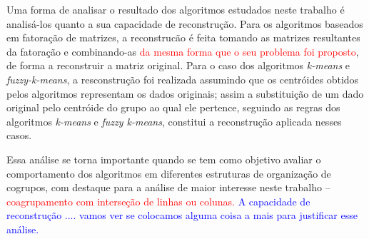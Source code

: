 \documentclass[
    12pt,                %
    oneside,            %
    a4paper,            %
    english,            %
    brazil                %
    ]{abntex2ppgsi}
\begin{document}

Uma forma de analisar o resultado dos algoritmos estudados neste trabalho é analisá-los quanto a sua capacidade de reconstrução. Para os algoritmos baseados em fatoração de matrizes, a reconstrucão é feita tomando as matrizes resultantes da fatoração e combinando-as \textcolor{red}{da mesma forma que o seu problema foi proposto}, de forma a reconstruir a matriz original. Para o caso dos algoritmos \textit{k-means} e \textit{fuzzy-k-means}, a resconstrução foi realizada assumindo que os centróides obtidos pelos algoritmos representam os dados originais; assim a substituição de um dado original pelo centróide do grupo ao qual ele pertence, seguindo as regras dos algoritmos \textit{k-means} e \textit{fuzzy k-means}, constitui a reconstrução aplicada nesses casos.

Essa análise se torna importante quando se tem como objetivo avaliar o comportamento dos algoritmos em diferentes estruturas de organização de cogrupos, com destaque para a análise de maior interesse neste trabalho -- \textcolor{red}{coagrupamento com interseção de linhas ou colunas.} \textcolor{blue}{A capacidade de reconstrução .... vamos ver se colocamos alguma coisa a mais para justificar esse análise.}
\end{document}
